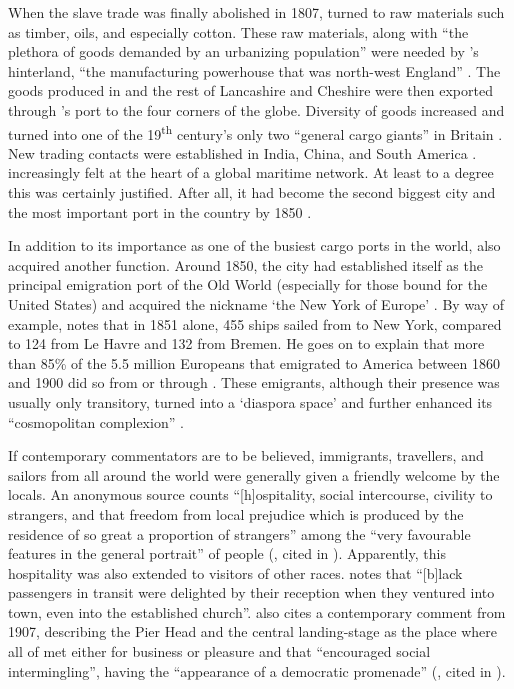 When the slave trade was finally abolished in 1807,  turned to raw materials such as timber, oils, and especially cotton.
These raw materials, along with ``the plethora of goods demanded by an urbanizing population'' were needed by 's hinterland, ``the manufacturing powerhouse that was north-west England'' \parencite[258]{milne2006}.
The goods produced in  and the rest of Lancashire and Cheshire were then exported through 's port to the four corners of the globe.
Diversity of goods increased and  turned into one of the 19\textsuperscript{th} century's only two ``general cargo giants'' in Britain \parencite[259]{milne2006}.
New trading contacts were established in India, China, and South America .
 increasingly felt at the heart of a global maritime network.
At least to a degree this was certainly justified.
After all, it had become the second biggest city and the most important port in the country by 1850 \citep[cf.][113--114]{honeybone2007}.

In addition to its importance as one of the busiest cargo ports in the world,  also acquired another function.
Around 1850, the city had established itself as the principal emigration port of the Old World (especially for those bound for the United States) and acquired the nickname `the New York of Europe' \parencite[xxvii]{belchem2006c}.
By way of example, \citet[14]{belchem2006a} notes that in 1851 alone, 455 ships sailed from  to New York, compared to 124 from Le Havre and 132 from Bremen.
He goes on to explain that more than 85\% of the 5.5 million Europeans that emigrated to America between 1860 and 1900 did so from or through .
These emigrants, although their presence was usually only transitory, turned  into a `diaspora space' and further enhanced its ``cosmopolitan complexion'' \parencite[14]{belchem2006a}.

If contemporary commentators are to be believed, immigrants, travellers, and sailors from all around the world were generally given a friendly welcome by the locals.
An anonymous source counts ``[h]ospitality, social intercourse, civility to strangers, and that freedom from local prejudice which is produced by the residence of so great a proportion of strangers'' among the ``very favourable features in the general portrait'' of  people (\citealt{anon1812}, cited in \citealt[12]{crowley2012}).
Apparently, this hospitality was also extended to visitors of other races.
\citet[13]{belchem2006a} notes that ``[b]lack passengers in transit were delighted by their reception when they ventured into town, even into the established church''.
\textcite{belchem2006d} also cites a contemporary comment from 1907, describing the Pier Head and the central landing-stage as the place where all of  met either for business or pleasure and that ``encouraged social intermingling'', having the ``appearance of a democratic promenade'' (\citealt{scott1907}, cited in \citealt[45]{belchem2006d}).

